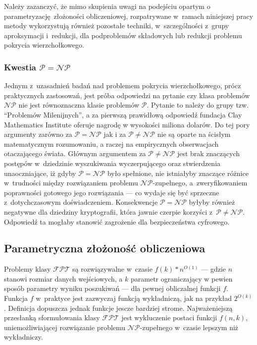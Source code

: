{Należy zazanczyć, że mimo skupienia uwagi na podejściu opartym o parametryzację złożoności obliczeniowej, rozpatrywane w~ramach niniejszej pracy metody wykorzystują również pozostałe techniki, w~szczególności z~grupy aproksymacji i~redukcji, dla podproblemów składowych lub redukcji problemu pokrycia wierzchołkowego.
}
\subsubsection{\textbf{Kwestia $\mathcal{P}=\mathcal{NP}$}}
\label{sss_problem_p_neq_np}
\par{
  Jednym z~uzasadnień badań nad problemem pokrycia wierzchołkowego, prócz
  praktycznych zastosowań, jest próba odpowiedzi na pytanie czy klasa problemów
  $\mathcal{NP}$ nie jest równoznaczna klasie problemów $\mathcal{P}$.
  Pytanie to należy do grupy tzw. ``Problemów Milenijnych'', a za pierwszą
  prawidłową odpowiedź fundacja Clay Mathematics Institute oferuje nagrodę w
  wysokości miliona dolarów. 
  Do tej pory argumenty zarówno za $\mathcal{P}=\mathcal{NP}$ jak i za
  $\mathcal{P}\neq\mathcal{NP}$ nie są oparte na ścisłym matematycznym
  rozumowaniu, a raczej na empirycznych obserwacjach otaczającego świata.
  Głównym argumentem za $\mathcal{P}\neq\mathcal{NP}$ jest brak znaczących
  postępów w~dziedzinie wyszukiwania wyczerpującego oraz stwierdzenia
  unaoczniające, iż gdyby $\mathcal{P}=\mathcal{NP}$ było spełnione, nie 
  istniałyby znaczące różnice w~trudności między rozwiązaniem 
  problemu $\mathcal{NP}$-zupełnego, a~zweryfikowaniem poprawności gotowego 
  jego rozwiązania --- co wydaje się być sprzeczne z~dotychczasowym doświadczeniem.
  Konsekwencje $\mathcal{P}=\mathcal{NP}$ byłyby również negatywne dla dziedziny
  kryptografii, która jawnie czerpie korzyści z~$\mathcal{P}\neq\mathcal{NP}$.
  Odpowiedź ta mogłaby stanowić zagrożenie dla bezpieczeństwa cyfrowego.
}

\subsection{Parametryczna złożoność obliczeniowa}
\label{sss_parametric_complexity}
\par{
  Problemy klasy $\mathcal{FPT}$ są rozwiązywalne w~czasie $f(k)*n^{O(1)}$ --- gdzie $n$ stanowi rozmiar danych wejściowych, a $k$ parametr ograniczający w pewien sposób parametry wyniku poszukiwań --- dla pewnej obliczalnej funkcji $f$.
  Funkcja $f$ w~praktyce jest zazwyczaj funkcją wykładniczą, jak na przykład $2^{O(k)}$.
  Definicja dopuszcza jednak funkcje jescze bardziej strome.
  Najważeniejszą przesłanką sformułowania klasy $\mathcal{FPT}$ jest wykluczenie postaci funkcji $f(n,k)$, uniemożliwiającej rozwiązanie problemu $\mathcal{NP}$-zupełnego w~czasie lepszym niż wykładniczy.
}

